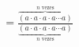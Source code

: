 \documentclass[preview]{standalone}
\begin{document}
\begin{align*}
=\frac{\overbrace{(a \cdot a \cdot a \cdot a \cdots a)}^{n \text{ vezes}}}{ \underbrace{(a \cdot a \cdot a \cdot a \cdots a)}_{n \text{ vezes}}}
\end{align*}
\end{document}
